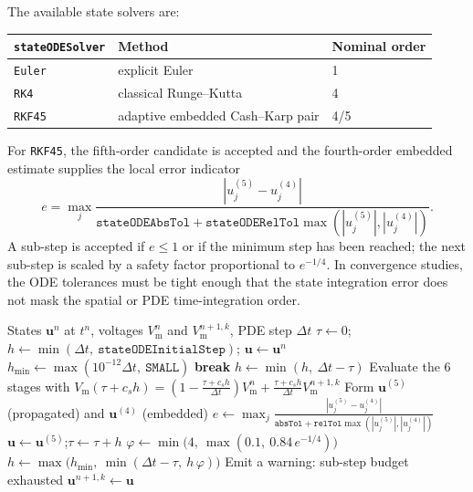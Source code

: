 \documentclass[11pt,a4paper]{article}
\newcommand{\code}[1]{\texttt{\small #1}}
\newcommand{\Vm}{V_{\text{m}}}
\begin{document}
The available state solvers are:
\begin{center}
\begin{tabular}{@{}lll@{}}
\toprule
\code{stateODESolver} & Method & Nominal order \\
\midrule
\code{Euler} & explicit Euler & 1 \\
\code{RK4} & classical Runge--Kutta & 4 \\
\code{RKF45} & adaptive embedded Cash--Karp pair & 4/5 \\
\bottomrule
\end{tabular}
\end{center}
For \code{RKF45}, the fifth-order candidate is accepted and the fourth-order
embedded estimate supplies the local error indicator
\begin{equation}
  e =
  \max_j
  \frac{|u^{(5)}_j-u^{(4)}_j|}
       {\texttt{stateODEAbsTol}+
        \texttt{stateODERelTol}\max(|u^{(5)}_j|,|u^{(4)}_j|)}.
\end{equation}
A sub-step is accepted if $e\le 1$ or if the minimum step has been reached; the
next sub-step is scaled by a safety factor proportional to $e^{-1/4}$. In
convergence studies, the ODE tolerances must be tight enough that the state
integration error does not mask the spatial or PDE time-integration order.

\begin{algorithm}[h!]
\caption{Adaptive sub-step control of the embedded 5(4) pair inside one PDE
time step}
\label{alg:rkf45}
\begin{algorithmic}[1]
\Require States $\mathbf{u}^n$ at $t^n$, voltages $\Vm^n$ and $\Vm^{n+1,k}$, PDE step $\Delta t$
\State $\tau \gets 0$;\quad
       $h \gets \min(\Delta t,\ \texttt{stateODEInitialStep})$;\quad
       $\mathbf{u} \gets \mathbf{u}^n$
\State $h_{\min} \gets \max(10^{-12}\Delta t,\ \texttt{SMALL})$
   \State \textbf{break} \EndIf
  \State $h \gets \min(h,\ \Delta t-\tau)$
  \State Evaluate the 6 stages with $\Vm(\tau+c_sh)=(1-\tfrac{\tau+c_sh}{\Delta t})\Vm^n+\tfrac{\tau+c_sh}{\Delta t}\Vm^{n+1,k}$
  \State Form $\mathbf{u}^{(5)}$ (propagated) and $\mathbf{u}^{(4)}$ (embedded)
  \State $e \gets \displaystyle\max_{j}
         \frac{|u^{(5)}_j-u^{(4)}_j|}
              {\texttt{absTol}+\texttt{relTol}\max(|u^{(5)}_j|,|u^{(4)}_j|)}$
    \State $\mathbf{u} \gets \mathbf{u}^{(5)}$;\quad $\tau \gets \tau + h$
  \Else
  \EndIf
  \State $\varphi \gets \min\!\big(4,\ \max(0.1,\ 0.84\,e^{-1/4})\big)$
  \State $h \gets \max\!\big(h_{\min},\ \min(\Delta t-\tau,\ h\,\varphi)\big)$
\EndFor
{}
  \State Emit a warning: sub-step budget exhausted
\EndIf
\Ensure $\mathbf{u}^{n+1,k} \gets \mathbf{u}$
\end{algorithmic}
\end{algorithm}
\end{document}
